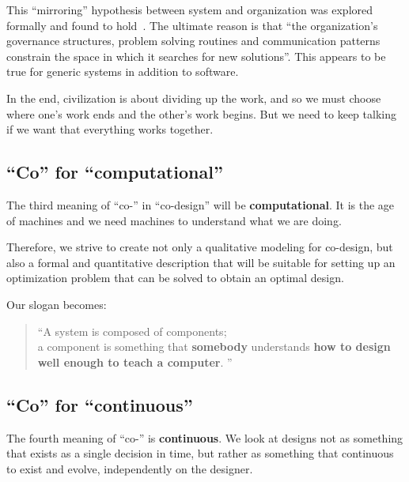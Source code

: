This ``mirroring'' hypothesis between system and organization was explored formally and found to hold~\cite{maccormack12exploring}.
The ultimate reason is that ``the organization's governance structures, problem solving routines and communication patterns constrain the space in which it searches for new solutions''.
This appears to be true for generic systems in addition to software.

In the end, civilization is about dividing up the work, and so we must choose where one's work ends and the other's work begins.
But we need to keep talking if we want that everything works together.

\subsection{``Co'' for ``computational''}

The third meaning of ``co-'' in ``co-design'' will be \textbf{computational}.
It is the age of machines and we need machines to understand what we are doing.

Therefore, we strive to create not only a qualitative modeling for co-design, but also a formal and quantitative description that will be suitable for setting up an optimization problem that can be solved to obtain an optimal design.

Our slogan becomes:

\begin{quote}
	\enquote{A system is composed of components;\\
		a component is something that \textbf{somebody} understands
		\textbf{how to design} \textbf{well enough to teach a computer}.
	}
\end{quote}

\subsection{``Co'' for ``continuous''}

The fourth meaning of ``co-'' is \textbf{continuous}.
We look at designs not as something that exists as a single decision in time, but rather as something that continuous to exist and evolve, independently on the designer.


